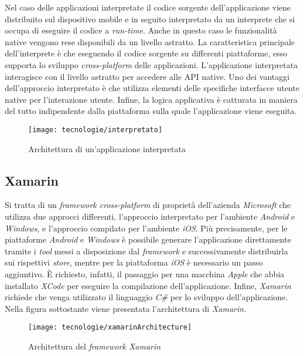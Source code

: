 Nel caso delle applicazioni interpretate il codice sorgente dell'applicazione viene distribuito sul dispositivo mobile e in seguito interpretato da un interprete che si occupa di eseguire il codice a \textit{run-time}. Anche in questo caso le funzionalità native vengono rese disponibili da un livello astratto. La caratteristica principale dell'interprete è che eseguendo il codice sorgente su differenti piattaforme, esso supporta lo sviluppo \textit{cross-platform} delle applicazioni. L'applicazione interpretata interagisce con il livello astratto per accedere alle API native. Uno dei vantaggi dell'approccio interpretato è che utilizza elementi delle specifiche interfacce utente native per l'interazione utente. Infine, la logica applicativa è catturata in maniera del tutto indipendente dalla piattaforma sulla quale l'applicazione viene eseguita.

\begin{figure}[!h] 
    \centering 
    \texttt{[image: tecnologie/interpretato]} 
    \caption{Architettura di un'applicazione interpretata}
\end{figure}

\newpage

\subsection{Xamarin}

Si tratta di un \textit{framework cross-platform} di proprietà dell'azienda \textit{Microsoft} che utilizza due approcci differenti, l'approccio interpretato per l'ambiente \textit{Android} e \textit{Windows}, e l'approccio compilato per l'ambiente \textit{iOS}. Più precisamente, per le piattaforme \textit{Android} e \textit{Windows} è possibile generare l'applicazione direttamente tramite i \textit{tool} messi a disposizione dal \textit{framework} e successivamente distribuirla sui rispettivi \textit{store}, mentre per la piattaforma \textit{iOS} è necessario un passo aggiuntivo. È richiesto, infatti, il passaggio per una macchina \textit{Apple} che abbia installato \textit{XCode} per eseguire la compilazione dell'applicazione. Infine, \textit{Xamarin} richiede che venga utilizzato il linguaggio \textit{C\#} per lo sviluppo dell'applicazione. Nella figura sottostante viene presentata l'architettura di \textit{Xamarin}.

\begin{figure}[!h] 
    \centering 
    \texttt{[image: tecnologie/xamarinArchitecture]} 
    \caption{Architettura del \textit{framework Xamarin}}
\end{figure}

